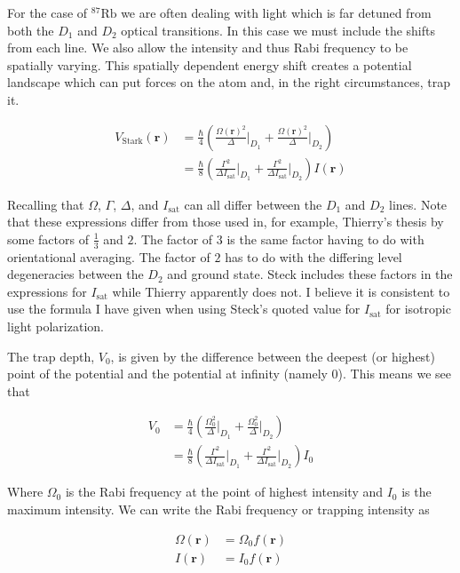 \documentclass[12pt]{article}
\newcommand{\bv}[1]{\boldsymbol{#1}}
\begin{document}
For the case of $^{87}\text{Rb}$ we are often dealing with light which is far detuned from both the $D_1$ and $D_2$ optical transitions. In this case we must include the shifts from each line. We also allow the intensity and thus Rabi frequency to be spatially varying. This spatially dependent energy shift creates a potential landscape which can put forces on the atom and, in the right circumstances, trap it. 

\begin{align}
V_{\text{Stark}}(\bv{r}) &= \frac{\hbar}{4} \left(\frac{\Omega(\bv{r})^2}{\Delta}\Big|_{D_1} + \frac{\Omega(\bv{r})^2}{\Delta}\Big|_{D_2} \right)\\
&= \frac{\hbar}{8} \left(\frac{\Gamma^2}{\Delta I_{\text{sat}}} \Big|_{D_1} + \frac{\Gamma^2}{\Delta I_{\text{sat}}} \Big|_{D_2} \right) I(\bv{r})
\end{align}

Recalling that $\Omega$, $\Gamma$, $\Delta$, and $I_{\text{sat}}$ can all differ between the $D_1$ and $D_2$ lines. Note that these expressions differ from those used in, for example, Thierry's thesis by some factors of $\frac{1}{3}$ and $2$. The factor of $3$ is the same factor having to do with orientational averaging. The factor of $2$ has to do with the differing level degeneracies between the $D_2$ and ground state. Steck includes these factors in the expressions for $I_{\text{sat}}$ while Thierry apparently does not. I believe it is consistent to use the formula I have given when using Steck's quoted value for $I_{\text{sat}}$ for isotropic light polarization.

The trap depth, $V_0$, is given by the difference between the deepest (or highest) point of the potential and the potential at infinity (namely 0). This means we see that

\begin{align}
V_0 &= \frac{\hbar}{4} \left(\frac{\Omega_0^2}{\Delta}\Big|_{D_1} + \frac{\Omega_0^2}{\Delta}\Big|_{D_2} \right)\\
&= \frac{\hbar}{8} \left(\frac{\Gamma^2}{\Delta I_{\text{sat}}} \Big|_{D_1} + \frac{\Gamma^2}{\Delta I_{\text{sat}}} \Big|_{D_2} \right) I_0
\end{align}

Where $\Omega_0$ is the Rabi frequency at the point of highest intensity and $I_0$ is the maximum intensity. We can write the Rabi frequency or trapping intensity as

\begin{align}
\Omega(\bv{r}) & = \Omega_0 f(\bv{r})\\
I(\bv{r}) &= I_0 f(\bv{r})\\
\end{align}
\end{document}
